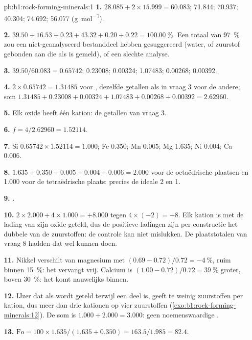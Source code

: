 \begin{solution}{pb:b1:rock-forming-minerals:1}
\textbf{1.}  $28.085 + 2\times15.999 = 60.083$;  71.844;
 70.937;  40.304;  74.692;  56.077
(\si{g.mol^{-1}}).

\textbf{2.} $39.50 + 16.53 + 0.23 + 43.32 + 0.20 + 0.22 =
\qty{100.00}{\percent}$. Een totaal van \qty{97}{\percent} zou een niet-geanalyseerd
bestanddeel hebben gesuggereerd (water, of zuurstof gebonden aan  die als  is gemeld),
of een slechte analyse.

\textbf{3.}  $39.50/60.083 = 0.65742$;  0.23008; 
0.00324;  1.07483;  0.00268;  0.00392.

\textbf{4.} $2\times0.65742 = 1.31485$ voor , dezelfde getallen als in
vraag 3 voor de andere; som $1.31485 + 0.23008 + 0.00324 + 1.07483 +
0.00268 + 0.00392 = 2.62960$.

\textbf{5.} Elk oxide heeft één kation: de getallen van vraag 3.

\textbf{6.} $f = 4/2.62960 = 1.52114$.

\textbf{7.} Si $0.65742\times1.52114 = 1.000$; Fe 0.350; Mn 0.005; Mg 1.635;
Ni 0.004; Ca 0.006.

\textbf{8.} $1.635 + 0.350 + 0.005 + 0.004 + 0.006 = 2.000$ voor de
octaëdrische plaatsen en 1.000 voor de tetraëdrische plaats: precies de ideale 2 en
1.

\textbf{9.} .

\textbf{10.} $2\times2.000 + 4\times1.000 = +8.000$ tegen $4\times(-2) =
-8$. Elk kation is met de lading van zijn oxide geteld, dus de positieve ladingen zijn per constructie
het dubbele van de zuurstoffen: de controle kan niet mislukken. De plaatstotalen van vraag 8 hadden dat wel kunnen doen.

\textbf{11.} Nikkel verschilt van magnesium met
$(0.69 - 0.72)/0.72 = -\qty{4}{\percent}$, ruim binnen \qty{15}{\percent}:
het vervangt vrij. Calcium is $(1.00 - 0.72)/0.72 = \qty{39}{\percent}$
groter, boven \qty{30}{\percent}: het komt nauwelijks binnen.

\textbf{12.} IJzer dat als  wordt geteld terwijl een deel  is, geeft te weinig
zuurstoffen per kation, dus meer dan drie kationen op vier zuurstoffen
(\cref{exo:b1:rock-forming-minerals:12}). De som is $1.000 + 2.000 = 3.000$: geen noemenswaardige
.

\textbf{13.} $\mathrm{Fo} = 100\times1.635/(1.635 + 0.350) = 163.5/1.985 =
82.4$.


\end{solution}
